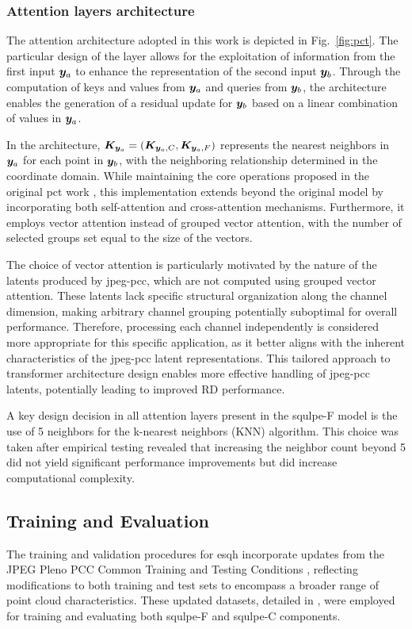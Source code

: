 \subsubsection{\textbf{Attention layers architecture}}

The attention architecture adopted in this work is depicted in Fig.~\ref{fig:pct}. The particular design of the layer allows for the exploitation of information from the first input $\y_a$ to enhance the representation of the second input $\y_b$. Through the computation of keys and values from $\y_a$ and queries from $\y_b$, the architecture enables the generation of a residual update for $\y_b$ based on a linear combination of values in $\y_a$.

In the architecture, $\K_{\y_a} = (\K_{\y_a,C}, \K_{\y_a,F})$ represents the nearest neighbors in $\y_a$ for each point in $\y_b$, with the neighboring relationship determined in the coordinate domain. While maintaining the core operations proposed in the original \gls{pct} work \cite{wu2022point}, this implementation extends beyond the original model by incorporating both self-attention and cross-attention mechanisms. Furthermore, it employs vector attention instead of grouped vector attention, with the number of selected groups set equal to the size of the vectors.

The choice of vector attention is particularly motivated by the nature of the latents produced by \gls{jpeg-pcc}, which are not computed using grouped vector attention. These latents lack specific structural organization along the channel dimension, making arbitrary channel grouping potentially suboptimal for overall performance. Therefore, processing each channel independently is considered more appropriate for this specific application, as it better aligns with the inherent characteristics of the \gls{jpeg-pcc} latent representations. This tailored approach to transformer architecture design enables more effective handling of \gls{jpeg-pcc} latents, potentially leading to improved RD performance.

A key design decision in all attention layers present in the \gls{squlpe}-F model is the use of 5 neighbors for the k-nearest neighbors (KNN) algorithm. This choice was taken after empirical testing revealed that increasing the neighbor count beyond 5 did not yield significant performance improvements but did increase computational complexity. 


\subsection{Training and Evaluation}
The training and validation procedures for \gls{esqh} incorporate updates from the JPEG Pleno PCC Common Training and Testing Conditions \cite{jpeg-pleno-cttc}, reflecting modifications to both training and test sets to encompass a broader range of point cloud characteristics. These updated datasets, detailed in \cite{jpeg-pleno, jpeg-pleno-cttc}, were employed for training and evaluating both \gls{squlpe}-F and \gls{squlpe}-C components.

